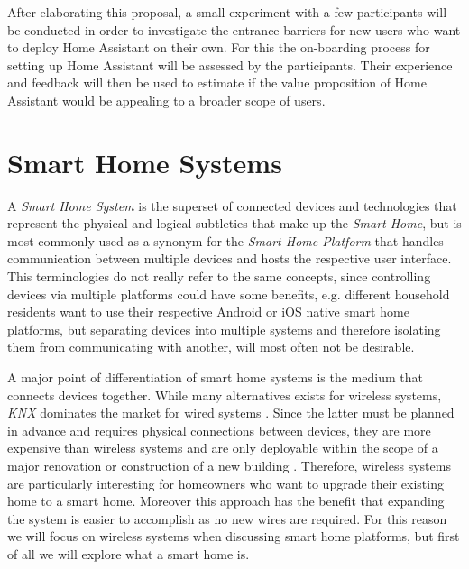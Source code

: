After elaborating this proposal, a small experiment with a few participants will be conducted in order to investigate the entrance barriers for new users who want to deploy Home Assistant on their own. For this the on-boarding process for setting up  Home Assistant will be assessed by the participants. Their experience and feedback will then be used to estimate if the value proposition of Home Assistant would be appealing to a broader scope of users.

\newpage


\section{Smart Home Systems}
A \textit{Smart Home System} is the superset of connected devices and technologies that represent the physical and logical subtleties that make up the \textit{Smart Home}, but is most commonly used as a synonym for the \textit{Smart Home Platform} that handles communication between multiple devices and hosts the respective user interface.
This terminologies do not really refer to the same concepts, since controlling devices via multiple platforms could have some benefits, e.g. different household residents want to use their respective Android or iOS native smart home platforms, but separating devices into multiple systems and therefore isolating them from communicating with another, will most often not be desirable.

A major point of differentiation of smart home systems is the medium that connects devices together. While many alternatives exists for wireless systems, \textit{KNX} dominates the market for wired systems \cite{BertkoChris2017HSH:}. Since the latter must be planned in advance and requires physical connections between devices, they are more expensive than wireless systems and are only deployable within the scope of a major renovation or construction of a new building \cite{BertkoChris2017HSH:}. Therefore, wireless systems are particularly interesting for homeowners who want to upgrade their existing home to a smart home. Moreover this approach has the benefit that expanding the system is easier to accomplish as no new wires are required. For this reason we will focus on wireless systems when discussing smart home platforms, but first of all we will explore what a smart home is.

